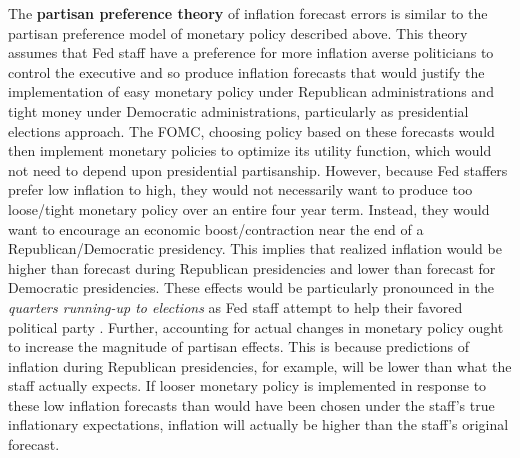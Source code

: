 \documentclass[a4paper]{article}
\begin{document}
The {\bf{partisan preference theory}} of inflation forecast errors is similar to the partisan preference model of monetary policy described above. This theory assumes that Fed staff have a preference for more inflation averse politicians to control the executive and so produce inflation forecasts that would justify the implementation of easy monetary policy under Republican administrations and tight money under Democratic administrations, particularly as presidential elections approach. The FOMC, choosing policy based on these forecasts would then implement monetary policies to optimize its utility function, which would not need to depend upon presidential partisanship. However, because Fed staffers prefer low inflation to high, they would not necessarily want to produce too loose/tight monetary policy over an entire four year term. Instead, they would want to encourage an economic boost/contraction near the end of a Republican/Democratic presidency. This implies that realized inflation would be higher than forecast during Republican presidencies and lower than forecast for Democratic presidencies. These effects would be particularly pronounced in the {\emph{quarters running-up to elections}} as Fed staff attempt to help their favored political party \citep{Beck1987,Grier1987}. Further, accounting for actual changes in monetary policy ought to increase the magnitude of partisan effects. This is because predictions of inflation during Republican presidencies, for example, will be lower than what the staff actually expects. If looser monetary policy is implemented in response to these low inflation forecasts than would have been chosen under the staff's true inflationary expectations, inflation will actually be higher than the staff's original forecast.
\end{document}
